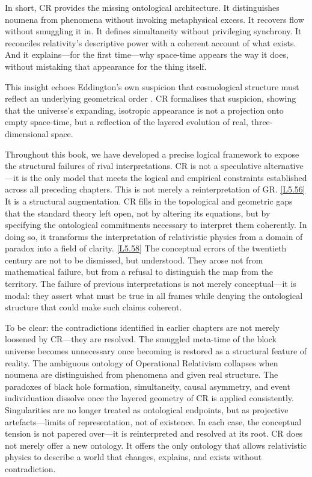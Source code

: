 \documentclass[12pt]{book}
\newcounter{logicanchor}
\newenvironment{logicanchorenv}[1]{\refstepcounter{logicanchor}\label{#1}}{}
\newcommand{\logiclink}[2]{\begin{logicanchorenv}{logic:#1}\end{logicanchorenv}\hyperref[appendix:#1]{[#1]}\xspace}
\begin{document}
In short, CR provides the missing ontological architecture. It distinguishes noumena from phenomena without invoking metaphysical excess. It recovers flow without smuggling it in. It defines simultaneity without privileging synchrony. It reconciles relativity's descriptive power with a coherent account of what exists. And it explains---for the first time---why space-time appears the way it does, without mistaking that appearance for the thing itself.

This insight echoes Eddington's own suspicion that cosmological structure must reflect an underlying geometrical order \citep{Eddington1923}. CR formalises that suspicion, showing that the universe's expanding, isotropic appearance is not a projection onto empty space-time, but a reflection of the layered evolution of real, three-dimensional space.

Throughout this book, we have developed a precise logical framework to expose the structural failures of rival interpretations. CR is not a speculative alternative---it is the only model that meets the logical and empirical constraints established across all preceding chapters. This is not merely a reinterpretation of GR. \logiclink{L5.56}{} It is a structural augmentation. CR fills in the topological and geometric gaps that the standard theory left open, not by altering its equations, but by specifying the ontological commitments necessary to interpret them coherently. In doing so, it transforms the interpretation of relativistic physics from a domain of paradox into a field of clarity. \logiclink{L5.58}{} The conceptual errors of the twentieth century are not to be dismissed, but understood. They arose not from mathematical failure, but from a refusal to distinguish the map from the territory. The failure of previous interpretations is not merely conceptual---it is modal: they assert what must be true in all frames while denying the ontological structure that could make such claims coherent.

To be clear: the contradictions identified in earlier chapters are not merely loosened by CR---they are resolved. The smuggled meta-time of the block universe becomes unnecessary once becoming is restored as a structural feature of reality. The ambiguous ontology of Operational Relativism collapses when noumena are distinguished from phenomena and given real structure. The paradoxes of black hole formation, simultaneity, causal asymmetry, and event individuation dissolve once the layered geometry of CR is applied consistently. Singularities are no longer treated as ontological endpoints, but as projective artefacts---limits of representation, not of existence. In each case, the conceptual tension is not papered over---it is reinterpreted and resolved at its root. CR does not merely offer a new ontology. It offers the only ontology that allows relativistic physics to describe a world that changes, explains, and exists without contradiction.
\end{document}

